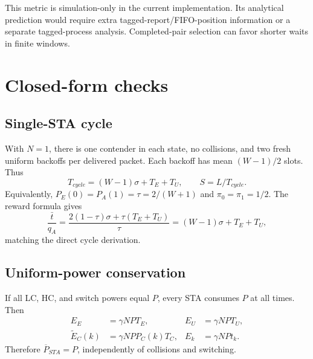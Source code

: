 \documentclass[11pt,a4paper]{article}
\begin{document}
This metric is simulation-only in the current implementation. Its analytical
prediction would require extra tagged-report/FIFO-position information or a
separate tagged-process analysis. Completed-pair selection can favor shorter
waits in finite windows.

\section{Closed-form checks}
\subsection{Single-STA cycle}
With $N=1$, there is one contender in each state, no collisions, and two
fresh uniform backoffs per delivered packet. Each backoff has mean
$(W-1)/2$ slots. Thus
\begin{equation}
T_{cycle}=(W-1)\sigma+T_E+T_U,\qquad S=L/T_{cycle}.
\end{equation}
Equivalently, $P_E(0)=P_A(1)=\tau=2/(W+1)$ and $\pi_0=\pi_1=1/2$.
The reward formula gives
\begin{equation}
\frac{\bar t}{q_A}
=\frac{2(1-\tau)\sigma+\tau(T_E+T_U)}{\tau}
=(W-1)\sigma+T_E+T_U,
\end{equation}
matching the direct cycle derivation.

\subsection{Uniform-power conservation}
If all LC, HC, and switch powers equal $P$, every STA consumes $P$ at
all times. Then
\begin{align}
E_E&=\gamma NPT_E,&E_U&=\gamma NPT_U,\\
\widetilde E_C(k)&=\gamma NP P_C(k)T_C,&E_k&=\gamma NPt_k.
\end{align}
Therefore $\overline P_{STA}=P$, independently of collisions and switching.
\end{document}

